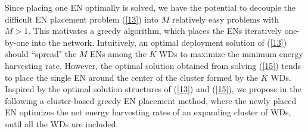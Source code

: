 \documentclass[journal, draftcls, one column, 12pt]{IEEEtran}
\begin{document}
Since placing one EN optimally is solved, we have the potential to decouple the difficult EN placement problem (\ref{13}) into $M$ relatively easy problems with $M>1$. This motivates a greedy algorithm, which places the ENs iteratively one-by-one into the network. Intuitively, an optimal deployment solution of (\ref{13}) should ``spread" the $M$ ENs among the $K$ WDs to maximize the minimum energy harvesting rate. However, the optimal solution obtained from solving (\ref{15}) tends to place the single EN around the center of the cluster formed by the $K$ WDs. Inspired by the optimal solution structures of (\ref{13}) and (\ref{15}), we propose in the following a cluster-based greedy EN placement method, where the newly placed EN optimizes the net energy harvesting rates of an expanding cluster of WDs, until all the WDs are included.
\end{document}
